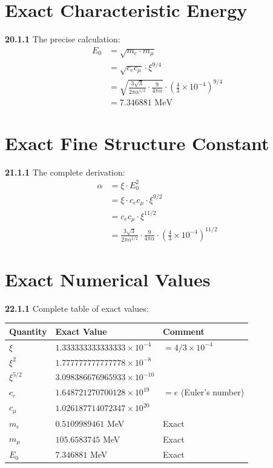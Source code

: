 \section{Exact Characteristic Energy}
\noindent \textbf{20.1.1} The precise calculation:
\begin{align}
	E_0 &= \sqrt{m_e \cdot m_\mu} \\
	&= \sqrt{c_e c_\mu} \cdot \xi^{9/4} \\
	&= \sqrt{\frac{3\sqrt{3}}{2\pi\alpha^{1/2}} \cdot \frac{9}{4\pi\alpha}} \cdot \left(\frac{4}{3} \times 10^{-4}\right)^{9/4} \\
	&= 7.346881 \text{ MeV}
\end{align}

\section{Exact Fine Structure Constant}
\noindent \textbf{21.1.1} The complete derivation:
\begin{align}
	\alpha &= \xi \cdot E_0^2 \\
	&= \xi \cdot c_e c_\mu \cdot \xi^{9/2} \\
	&= c_e c_\mu \cdot \xi^{11/2} \\
	&= \frac{3\sqrt{3}}{2\pi\alpha^{1/2}} \cdot \frac{9}{4\pi\alpha} \cdot \left(\frac{4}{3} \times 10^{-4}\right)^{11/2}
\end{align}

\section{Exact Numerical Values}

\noindent \textbf{22.1.1} Complete table of exact values:

\begin{table}[h]
	\centering
	\begin{tabular}{lll}
		\toprule
		Quantity & Exact Value & Comment \\
		\midrule
		$\xi$ & $1.333333333333333 \times 10^{-4}$ & $= 4/3 \times 10^{-4}$ \\
		$\xi^2$ & $1.777777777777778 \times 10^{-8}$ & \\
		$\xi^{5/2}$ & $3.098386676965933 \times 10^{-10}$ & \\
		$c_e$ & $1.648721270700128 \times 10^{19}$ & $= e$ (Euler's number) \\
		$c_\mu$ & $1.026187714072347 \times 10^{20}$ & \\
		$m_e$ & $0.5109989461$ MeV & Exact \\
		$m_\mu$ & $105.6583745$ MeV & Exact \\
		$E_0$ & $7.346881$ MeV & Exact \\
		\bottomrule
	\end{tabular}
\end{table}

